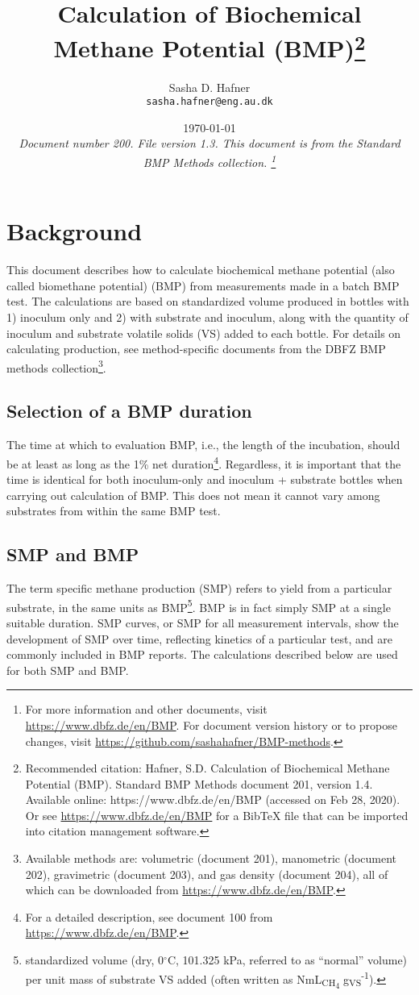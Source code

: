 \documentclass[]{article}
\title {Calculation of Biochemical Methane Potential (BMP)\footnote{
  Recommended citation: 
Hafner, S.D. Calculation of Biochemical Methane Potential (BMP). Standard BMP Methods document 201, version 1.4. Available online: https://www.dbfz.de/en/BMP (accessed on Feb 28, 2020).
\newline
  Or see \url{https://www.dbfz.de/en/BMP} for a BibTeX file that can be imported into citation management software.
}}
\author{Sasha D. Hafner\\
\texttt{sasha.hafner@eng.au.dk}
}
\date{\today \\
\bigskip
\textit{
  Document number 200.
  File version 1.3. 
  This document is from the Standard BMP Methods collection.
    \footnote{For more information and other documents, visit \url{https://www.dbfz.de/en/BMP}. 
    For document version history or to propose changes, visit \url{https://github.com/sashahafner/BMP-methods}.}
}
}
\begin{document}
\maketitle

\section{Background}
This document describes how to calculate biochemical methane potential (also called biomethane potential) (BMP) from measurements made in a batch BMP test.
The calculations are based on standardized  volume produced in bottles with 1) inoculum only and 2) with substrate and inoculum, along with the quantity of inoculum and substrate volatile solids (VS) added to each bottle.
For details on calculating  production, see method-specific documents from the DBFZ BMP methods collection\footnote{
  Available methods are: volumetric (document 201), manometric (document 202), gravimetric (document 203), and gas density (document 204), all of which can be downloaded from \url{https://www.dbfz.de/en/BMP}.
}.

\subsection{Selection of a BMP duration}
The time at which to evaluation BMP, i.e., the length of the incubation, should be at least as long as the 1\% net duration\footnote{
  For a detailed description, see document 100 from \url{https://www.dbfz.de/en/BMP}.
}.
Regardless, it is important that the time is identical for both inoculum-only and inoculum + substrate bottles when carrying out calculation of BMP.
This does not mean it cannot vary among substrates from within the same BMP test.

\subsection{SMP and BMP}
The term specific methane production (SMP) refers to  yield from a particular substrate, in the same units as BMP\footnote{
standardized  volume (dry, 0$^\circ$C, 101.325 kPa, referred to as ``normal'' volume) per unit mass of substrate VS added (often written as NmL\textsubscript{CH\textsubscript{4}} g\textsubscript{VS}\textsuperscript{-1}).
}.
BMP is in fact simply SMP at a single suitable duration.
SMP curves, or SMP for all measurement intervals, show the development of SMP over time, reflecting kinetics of a particular test, and are commonly included in BMP reports.
The calculations described below are used for both SMP and BMP.
\end{document}
